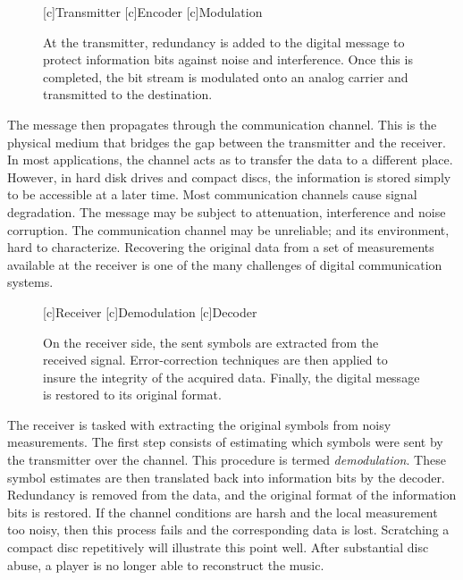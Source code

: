 \begin{figure}[htbp]
\begin{center}
\begin{psfrags}
[c]{Transmitter}
[c]{Encoder}
[c]{Modulation}
\end{psfrags}
\end{center}
\caption{At the transmitter, redundancy is added to the digital message to protect information bits against noise and interference.
Once this is completed, the bit stream is modulated onto an analog carrier and transmitted to the destination.}
\label{figure:BlockTransmitter}
\end{figure}

The message then propagates through the communication channel.
This is the physical medium that bridges the gap between the transmitter and the receiver.
In most applications, the channel acts as to transfer the data to a different place.
However, in hard disk drives and compact discs, the information is stored simply to be accessible at a later time.
Most communication channels cause signal degradation.
The message may be subject to attenuation, interference and noise corruption.
The communication channel may be unreliable; and its environment, hard to characterize.
Recovering the original data from a set of measurements available at the receiver is one of the many challenges of digital communication systems.

\begin{figure}[htbp]
\begin{center}
\begin{psfrags}
[c]{Receiver}
[c]{Demodulation}
[c]{Decoder}
\end{psfrags}
\end{center}
\caption{On the receiver side, the sent symbols are extracted from the received signal.
Error-correction techniques are then applied to insure the integrity of the acquired data.
Finally, the digital message is restored to its original format.}
\label{figure:BlockReceiver}
\end{figure}

The receiver is tasked with extracting the original symbols from noisy measurements.
The first step consists of estimating which symbols were sent by the transmitter over the channel.
This procedure is termed \emph{demodulation}.
These symbol estimates are then translated back into information bits by the decoder.
Redundancy is removed from the data, and the original format of the information bits is restored.
If the channel conditions are harsh and the local measurement too noisy, then this process fails and the corresponding data is lost.
Scratching a compact disc repetitively will illustrate this point well.
After substantial disc abuse, a player is no longer able to reconstruct the music.


